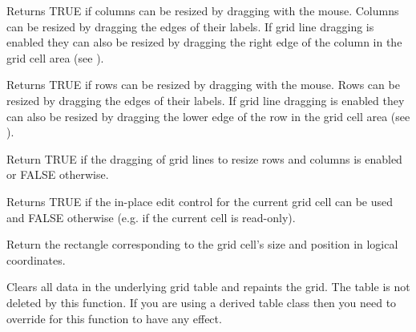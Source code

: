 
Returns TRUE if columns can be resized by dragging with the mouse.  Columns can be resized
by dragging the edges of their labels. If grid line dragging is enabled they can also be
resized by dragging the right edge of the column in the grid cell area 
(see ).

\label{wxgridcandragrowsize}


Returns TRUE if rows can be resized by dragging with the mouse.  Rows can be resized
by dragging the edges of their labels. If grid line dragging is enabled they can also be
resized by dragging the lower edge of the row in the grid cell area 
(see ).

\label{wxgridcandraggridsize}


Return TRUE if the dragging of grid lines to resize rows and columns is enabled or FALSE otherwise.

\label{wxgridcanenablecellcontrol}


Returns TRUE if the in-place edit control for the current grid cell can be used and
FALSE otherwise (e.g. if the current cell is read-only).

\label{wxgridcelltorect}



Return the rectangle corresponding to the grid cell's size and position in logical
coordinates.

\label{wxgridcleargrid}


Clears all data in the underlying grid table and repaints the grid. The table is not deleted by
this function. If you are using a derived table class then you need to override 
 for this function to have any effect.

